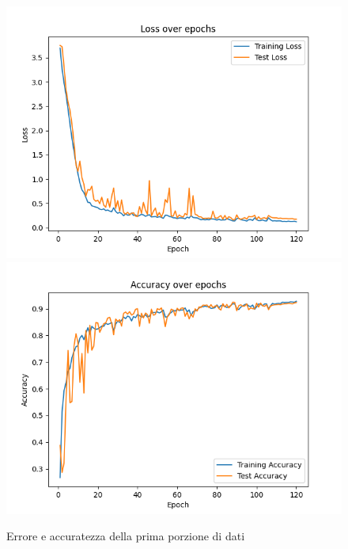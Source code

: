 \begin{figure}[!ht]
	\begin{adjustbox}{width=0.9\columnwidth, center}
    \includegraphics{./images/fold_0_loss.png} \includegraphics{./images/fold_0_accuracy.png}
  \end{adjustbox}
  \caption{Errore e accuratezza della prima porzione di dati}
  \label{fig:loss e accuratezza della prima porzione di dati}
\end{figure}

